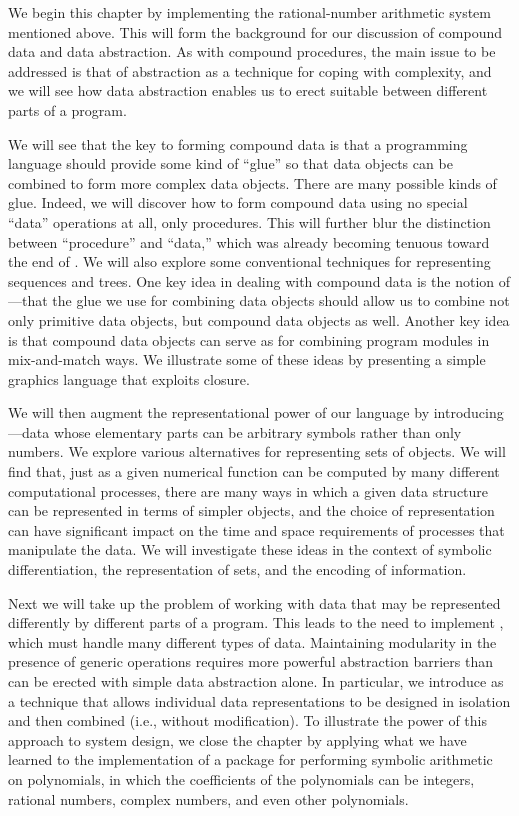We begin this chapter by implementing the rational-number arithmetic system mentioned above.
This will form the background for our discussion of compound data and data abstraction.
As with compound procedures, the main issue to be addressed is that of abstraction as a technique for coping with complexity, and we will see how data abstraction enables us to erect suitable  between different parts of a program.

We will see that the key to forming compound data is that a programming language should provide some kind of “glue” so that data objects can be combined to form more complex data objects.
There are many possible kinds of glue.
Indeed, we will discover how to form compound data using no special “data” operations at all, only procedures.
This will further blur the distinction between “procedure” and “data,” which was already becoming tenuous toward the end of .
We will also explore some conventional techniques for representing sequences and trees.
One key idea in dealing with compound data is the notion of ---that the glue we use for combining data objects should allow us to combine not only primitive data objects, but compound data objects as well.
Another key idea is that compound data objects can serve as  for combining program modules in mix-and-match ways.
We illustrate some of these ideas by presenting a simple graphics language that exploits closure.

We will then augment the representational power of our language by introducing ---data whose elementary parts can be arbitrary symbols rather than only numbers.
We explore various alternatives for representing sets of objects.
We will find that, just as a given numerical function can be computed by many different computational processes, there are many ways in which a given data structure can be represented in terms of simpler objects, and the choice of representation can have significant impact on the time and space requirements of processes that manipulate the data.
We will investigate these ideas in the context of symbolic differentiation, the representation of sets, and the encoding of information.

Next we will take up the problem of working with data that may be represented differently by different parts of a program.
This leads to the need to implement , which must handle many different types of data.
Maintaining modularity in the presence of generic operations requires more powerful abstraction barriers than can be erected with simple data abstraction alone.
In particular, we introduce  as a technique that allows individual data representations to be designed in isolation and then combined  (i.e., without modification).
To illustrate the power of this approach to system design, we close the chapter by applying what we have learned to the implementation of a package for performing symbolic arithmetic on polynomials, in which the coefficients of the polynomials can be integers, rational numbers, complex numbers, and even other polynomials.






